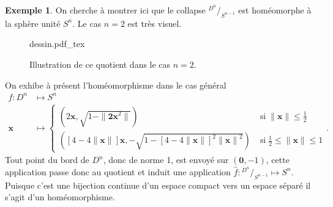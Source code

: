 \documentclass[12pt]{book}
\newcommand{\incfig}[1]{%
    \def\svgwidth{\columnwidth}
    {#1.pdf_tex} 
}
\theoremstyle{definition}
\newtheorem{example}[lemma]{Exemple}
\theoremstyle{remark}
\newcommand*\quot[2]{{^{\textstyle #1}\big/_{\textstyle #2}}}
\begin{document}
	\begin{example}
		On cherche à montrer ici que le collapse $\quot{D^n}{S^{n-1}}$ est homéomorphe à la sphère unité $S^n$. Le cas $n=2$ est très visuel.
		\begin{figure}[ht!]
			\centering
			\incfig{dessin}
			\caption{Illustration de ce quotient dans le cas $n=2$.}
		\end{figure}
		On exhibe à présent l'homéomorphisme dans le cas général
		\begin{align*}
			f : D^n &\longmapsto S^n \\
			\textbf{x} &\longmapsto \begin{cases}
				(2\textbf{x},\sqrt{1-\|\textbf{2x}^2\|}) \; &\text{si} \; \|\textbf{x}\| \le \frac{1}{2} \\
				([4-4\|\textbf{x}\|]\textbf{x},-\sqrt{1-{[4-4\|\textbf{x}\|]}^2{\|\textbf{x}\|}^2}) \; &\text{si} \; \frac{1}{2} \le \|\textbf{x}\| \le 1
			\end{cases}
		.\end{align*}
		Tout point du bord de $D^n$, donc de norme 1, est envoyé sur  $(\textbf{0},-1)$, cette application passe donc au quotient et induit une application $\hat{f} : \quot{D^n}{S^{n-1}} \longmapsto S^n$. Puisque c'est une bijection continue d'un espace compact vers un espace séparé il s'agit d'un homéomorphisme.
	\end{example}
\end{document}
